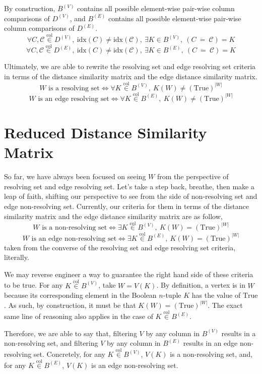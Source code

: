 \documentclass{article}
\begin{document}
By construction, \(B^{(V)}\) contains all possible element-wise pair-wise column comparisons of \(D^{(V)}\), and \(B^{(E)}\) contains all possible element-wise pair-wise column comparisons of \(D^{(E)}\).
\[
	\forall C, \mathcal{C} \overset{\mathrm{col}}{\in} D^{(V)},\ \mathrm{idx}(C) \neq \mathrm{idx}(\mathcal{C}),\ \exists K \in B^{(V)},\ (C\ \ddot{=}\ \mathcal{C}) = K
\]
\[
	\forall C, \mathcal{C} \overset{\mathrm{col}}{\in} D^{(E)},\ \mathrm{idx}(C) \neq \mathrm{idx}(\mathcal{C}),\ \exists K \in B^{(E)},\ (C\ \ddot{=}\ \mathcal{C}) = K
\]

Ultimately, we are able to rewrite the resolving set and edge resolving set criteria in terms of the distance similarity matrix and the edge distance similarity matrix.
\[
	W \text{ is a resolving set} \iff \forall K \overset{\mathrm{col}}{\in} B^{(V)},\ K(W) \neq (\mathrm{True})^{|W|}
\]
\[
	W \text{ is an edge resolving set} \iff \forall K \overset{\mathrm{col}}{\in} B^{(E)},\ K(W) \neq (\mathrm{True})^{|W|}
\]

\section{Reduced Distance Similarity Matrix}

So far, we have always been focused on seeing \(W\) from the perspective of resolving set and edge resolving set. Let's take a step back, breathe, then make a leap of faith, shifting our perspective to see from the side of non-resolving set and edge non-resolving set. Currently, our criteria for them in terms of the distance similarity matrix and the edge distance similarity matrix are as follow,
\[
	W \text{ is a non-resolving set} \iff \exists K \overset{\mathrm{col}}{\in} B^{(V)},\ K(W) = (\mathrm{True})^{|W|}
\]
\[
	W \text{ is an edge non-resolving set} \iff \exists K \overset{\mathrm{col}}{\in} B^{(E)},\ K(W) = (\mathrm{True})^{|W|}
\]
taken from the converse of the resolving set and edge resolving set criteria, literally.

We may reverse engineer a way to guarantee the right hand side of these criteria to be true. For any \(K \overset{\mathrm{col}}{\in} B^{(V)}\), take \(W = V(K)\). By definition, a vertex is in \(W\) because its corresponding element in the Boolean \(n\)-tuple \(K\) has the value of \(\mathrm{True}\). As such, by construction, it must be that \(K(W) = (\mathrm{True})^{|W|}\). The exact same line of reasoning also applies in the case of \(K \overset{\mathrm{col}}{\in} B^{(E)}\).

Therefore, we are able to say that, filtering \(V\) by any column in \(B^{(V)}\) results in a non-resolving set, and filtering \(V\) by any column in \(B^{(E)}\) results in an edge non-resolving set. Concretely, for any	\(K \overset{\mathrm{col}}{\in} B^{(V)}\), \(V(K)\) is a non-resolving set, and, for any	\(K \overset{\mathrm{col}}{\in} B^{(E)}\), \(V(K)\) is an edge non-resolving set.
\end{document}
